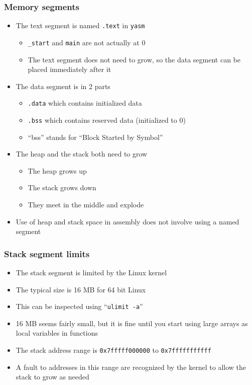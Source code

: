 \documentclass{beamer}
\begin{document}
\begin{frame}
    \frametitle{Memory segments}
    \begin{itemize}
        \item The text segment is named {\tt .text} in {\tt yasm}
        \begin{itemize}
            \item {\tt \_start} and {\tt main} are not actually at 0
            \item The text segment does not need to grow, so the data
                  segment can be placed immediately after it
        \end{itemize}
        \item The data segment is in 2 parts
        \begin{itemize}
            \item {\tt .data} which contains initialized data
            \item {\tt .bss} which contains reserved data (initialized to 0)
            \item ``bss'' stands for ``Block Started by Symbol''
        \end{itemize}
        \item The heap and the stack both need to grow
        \begin{itemize}
            \item The heap grows up
            \item The stack grows down
            \item They meet in the middle and explode
        \end{itemize}
        \item Use of heap and stack space in assembly does not involve
              using a named segment
    \end{itemize}
\end{frame}

\begin{frame}
    \frametitle{Stack segment limits}
    \begin{itemize}
        \item The stack segment is limited by the Linux kernel
        \item The typical size is 16 MB for 64 bit Linux
        \item This can be inspected using ``{\tt ulimit -a}''
        \item 16 MB seems fairly small, but it is fine until you start
              using large arrays as local variables in functions
        \item The stack address range is {\tt 0x7fffff000000} to {\tt 0x7fffffffffff}
        \item A fault to addresses in this range are recognized by the
            kernel to allow the stack to grow as needed
    \end{itemize}
\end{frame}
\end{document}
